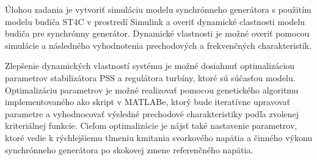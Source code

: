 Úlohou zadania je vytvoriť simuláciu modelu synchrónneho generátora s použitím modelu budiča ST4C v prostredí Simulink a overiť dynamické clastnosti modelu budiča pre synchrónny generátor. Dynamické vlastnosti je možné overiť pomocou simulácie a následného vyhodnotenia prechodových a frekvenčných charakteristík. 

Zlepšenie dynamických vlastností systému je možné dosiahnuť optimalizáciou parametrov stabilizátora PSS a regulátora turbíny, ktoré sú súčasťou modelu. Optimalizáciu parametrov je možné realizovať pomocou genetického algoritmu implementovaného ako skript v MATLABe, ktorý bude iteratívne upravovať parametre a vyhodnocovať výsledné prechodové charakteristiky podľa zvolenej kriteriálnej funkcie. Cieľom optimalizácie je nájsť také nastavenie parametrov, ktoré vedie k rýchlejšiemu tlmeniu kmitania svorkového napätia a činného výkonu synchrónneho generátora po skokovej zmene referenčného napätia.